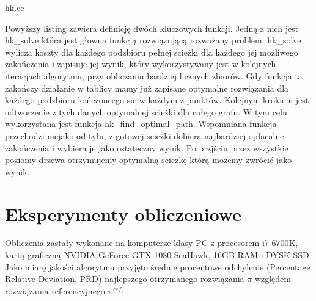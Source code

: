 \documentclass[polish,polish,a4paper]{article}
\begin{document}

{hk.cc}

Powyższy listing zawiera definicję dwóch kluczowych funkcji. Jedną z nich jest hk\_solve która jest głowną funkcją rozwiązującą rozważany problem.
hk\_solve wylicza koszty dla każdego podzbioru pełnej scieżki dla każdego jej możliwego zakończenia i zapisuje jej wynik, który wykorzystywany jest w kolejnych iteracjach algorytmu,
przy obliczaniu bardziej licznych zbiorów. Gdy funkcja ta zakończy działanie w tablicy mamy już zapisane optymalne rozwiązania dla każdego podzbioru kończoncego sie w każdym z punktów.
Kolejnym krokiem jest odtworzenie z tych danych optymalnej scieżki dla całego grafu. W tym celu wykorzystana jest funkcja hk\_find\_optimal\_path.
Wspomniana funkcja przechodzi niejako od tyłu, z gotowej scieżki dobiera najbardziej opłacalne zakończenia i wybiera je jako ostateczny wynik. Po przjściu przez wszystkie poziomy
drzewa otrzymujemy optymalną scieżkę którą możemy zwrócić jako wynik.

\section{Eksperymenty obliczeniowe}

Obliczenia zastały wykonane na komputerze klasy PC z procesorem i7-6700K, kartą graficzną NVIDIA GeForce GTX 1080 SeaHawk, 16GB RAM i DYSK SSD. Jako miarę jakości algorytmu przyjęto średnie procentowe odchylenie (Percentage Relative Deviation, PRD) najlepszego otrzymanego rozwiązania $\pi$ względem rozwiązania referencyjnego $\pi^{ref}$:
\end{document}

